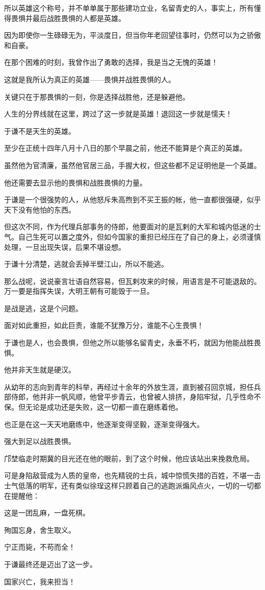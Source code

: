 \begin{multicols}{\theparacolNo}
所以英雄这个称号，并不单单属于那些建功立业，名留青史的人，事实上，所有懂得畏惧并最后战胜畏惧的人都是英雄。

因为即使你一生碌碌无为，平淡度日，但当你年老回望往事时，仍然可以为之骄傲和自豪。

在那个困难的时刻，我曾作出了勇敢的选择，我是当之无愧的英雄！

这就是我所认为真正的英雄——畏惧并战胜畏惧的人。

关键只在于那畏惧的一刻，你是选择战胜他，还是躲避他。

人生的分界线就在这里，跨过了这一步就是英雄！退回这一步就是懦夫！

于谦不是天生的英雄。

至少在正统十四年八月十八日的那个早晨之前，他还不能算是个真正的英雄。

虽然他为官清廉，虽然他官居三品，手握大权，但这些都不足证明他是一个英雄。

他还需要去显示他的畏惧和战胜畏惧的力量。

于谦是一个很强势的人，从他怒斥朱高煦到不买王振的帐，他一直都很强硬，似乎天下没有他怕的东西。

但这次不同，作为代理兵部事务的侍郎，他要面对的是瓦剌的大军和城内低迷的士气。自己生死可以置之度外，但如今国家的重担已经压在了自己的身上，必须谨慎处理，一旦出现失误，后果不堪设想。

于谦十分清楚，逃就会丢掉半壁江山，所以不能逃。

那么战呢，说说豪言壮语自然容易，但瓦剌攻来的时候，用语言是不可能退敌的。万一要是指挥失误，大明王朝有可能毁于一旦。

是战是逃，这是个问题。

面对如此重担，如此巨责，谁能不犹豫万分，谁能不心生畏惧！

于谦也是人，也会畏惧，但他之所以能够名留青史，永垂不朽，就因为他能战胜畏惧。

他并非天生就是硬汉。

从幼年的志向到青年的科举，再经过十余年的外放生涯，直到被召回京城，担任兵部侍郎，他并非一帆风顺，他曾平步青云，也曾被人排挤，身陷牢狱，几乎性命不保。但无论是成功还是失败，这一切都一直在磨练着他。

也正是在这一天天地磨练中，他逐渐变得坚毅，逐渐变得强大。

强大到足以战胜畏惧。

邝埜临走时期冀的目光还在他的眼前，到了这个时候，他应该站出来挽救危局。

可是身陷敌营成为人质的皇帝，也先精锐的士兵，城中惊慌失措的百姓，不堪一击士气低落的明军，还有类似徐珵这样只顾着自己的逃跑派煽风点火，一切的一切都在提醒他：

这是一团乱麻，一盘死棋。

殉国忘身，舍生取义。

宁正而毙，不苟而全！

于谦最终还是迈出了这一步。

国家兴亡，我来担当！
\ifnum{}
	\end{multicols}
\fi
\newpage
